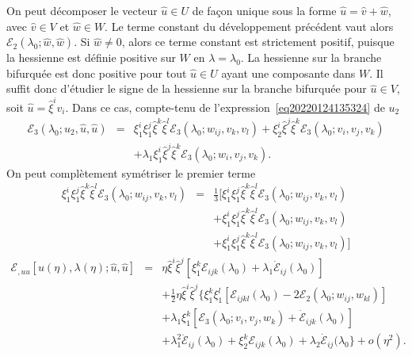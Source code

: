 \documentclass{article}
\newcommand{\nocomma}{}
\newcommand{\nonconverted}[1]{\mbox{}}
\begin{document}
On peut d{\'e}composer le vecteur $\hat{u} \in U$ de fa{\c c}on unique sous la
forme $\hat{u} = \hat{v} + \hat{w}$, avec $\hat{v} \in V$ et $\hat{w} \in W$.
Le terme constant du d{\'e}veloppement pr{\'e}c{\'e}dent vaut alors
$\mathcal{E}_2 (\lambda_0 ; \hat{w}, \hat{w})$. Si $\hat{w} \neq 0$, alors ce
terme constant est strictement positif, puisque la hessienne est d{\'e}finie
positive sur $W$ en $\lambda = \lambda_0$. La hessienne sur la branche
bifurqu{\'e}e est donc positive pour tout $\hat{u} \in U$ ayant une composante
dans $W$. Il suffit donc d'{\'e}tudier le signe de la hessienne sur la branche
bifurqu{\'e}e pour $\hat{u} \in V$, soit $\hat{u} = \hat{\xi}^i v_i$. Dans ce
cas, compte-tenu de l'expression~\eqref{eq20220124135324} de $u_2$
\begin{eqnarray}
  \mathcal{E}_3 (\lambda_0 ; u_2, \hat{u}, \hat{u}) & = & \xi_1^i \xi_1^j
  \hat{\xi}^k  \hat{\xi}^l \mathcal{E}_3 (\lambda_0 ; w_{i \nocomma j}, v_k,
  v_l) + \xi_2^i  \hat{\xi}^j  \hat{\xi}^k \mathcal{E}_3 (\lambda_0 ; v_i,
  v_j, v_k) \nonumber\\
  &  & + \lambda_1 \xi_1^i  \hat{\xi}^j  \hat{\xi}^k \mathcal{E}_3 (\lambda_0
  ; w_i, v_j, v_k) .
\end{eqnarray}
On peut compl{\`e}tement sym{\'e}triser le premier terme
\begin{eqnarray}
  \xi_1^i \xi_1^j  \hat{\xi}^k  \hat{\xi}^l \mathcal{E}_3 (\lambda_0 ; w_{i
  \nocomma j}, v_k, v_l) & = & \tfrac{1}{3} [\xi_1^i \xi_1^j  \hat{\xi}^k
  \hat{\xi}^l \mathcal{E}_3 (\lambda_0 ; w_{i \nocomma j}, v_k, v_l)
   \nonumber\\
  &  & + \xi_1^i \xi_1^j  \hat{\xi}^k  \hat{\xi}^l \mathcal{E}_3 (\lambda_0 ;
  w_{i \nocomma j}, v_k, v_l) \nonumber\\
  &  &  + \xi_1^i \xi_1^j  \hat{\xi}^k  \hat{\xi}^l \mathcal{E}_3
  (\lambda_0 ; w_{i \nocomma j}, v_k, v_l)]
\end{eqnarray}
\begin{eqnarray}
  \mathcal{E}_{, u \nocomma u} [u (\eta), \lambda (\eta) ; \hat{u}, \hat{u}] &
  = & \eta \hat{\xi}^i  \hat{\xi}^j  [\xi_1^k \mathcal{E}_{i \nocomma j
  \nocomma k} (\lambda_0) + \lambda_1  \dot{\mathcal{E}}_{i \nocomma j}
  (\lambda_0)] \nonumber\\
  &  & + \tfrac{1}{2} \eta \nonconverted{twosuperior} \hat{\xi}^i
  \hat{\xi}^j  \{ \xi_1^k \xi_1^l  [\mathcal{E}_{i \nocomma j \nocomma k
  \nocomma l} (\lambda_0) - 2\mathcal{E}_2 (\lambda_0 ; w_{i \nocomma j}, w_{k
  \nocomma l})]  \nonumber\\
  &  & + \lambda_1 \xi_1^k  [\mathcal{E}_3 (\lambda_0 ; v_i, v_j, w_k) +
  \dot{\mathcal{E}}_{i \nocomma j \nocomma k} (\lambda_0)] \nonumber\\
  &  & + \lambda_1^2  \ddot{\mathcal{E}}_{i \nocomma j} (\lambda_0) + \xi_2^k
  \mathcal{E}_{i \nocomma j \nocomma k} (\lambda_0) + \lambda_2
  \dot{\mathcal{E}}_{i \nocomma j} (\lambda_0 \} + o (\eta^2) .
  \label{eq20220203144500}
\end{eqnarray}
\end{document}
